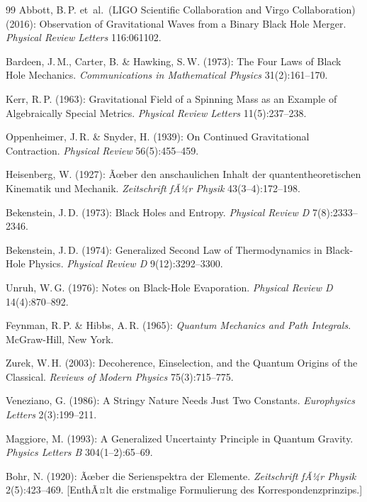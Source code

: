 ﻿\documentclass[12pt,a4paper]{report}
\begin{document}
\begin{thebibliography}{99}
Abbott, B.\,P. et\ al.\ (LIGO Scientific Collaboration and Virgo Collaboration) (2016): Observation of Gravitational Waves from a Binary Black Hole Merger. \textit{Physical Review Letters} 116:061102.

Bardeen, J.\,M., Carter, B. \& Hawking, S.\,W. (1973): The Four Laws of Black Hole Mechanics. \textit{Communications in Mathematical Physics} 31(2):161--170.

Kerr, R.\,P. (1963): Gravitational Field of a Spinning Mass as an Example of Algebraically Special Metrics. \textit{Physical Review Letters} 11(5):237--238.

Oppenheimer, J.\,R. \& Snyder, H. (1939): On Continued Gravitational Contraction. \textit{Physical Review} 56(5):455--459.


Heisenberg, W. (1927): Ãœber den anschaulichen Inhalt der quantentheoretischen Kinematik und Mechanik. \textit{Zeitschrift fÃ¼r Physik} 43(3--4):172--198.

Bekenstein, J.\,D. (1973): Black Holes and Entropy. \textit{Physical Review D} 7(8):2333--2346.

Bekenstein, J.\,D. (1974): Generalized Second Law of Thermodynamics in Black-Hole Physics. \textit{Physical Review D} 9(12):3292--3300.

Unruh, W.\,G. (1976): Notes on Black-Hole Evaporation. \textit{Physical Review D} 14(4):870--892.

Feynman, R.\,P. \& Hibbs, A.\,R. (1965): \textit{Quantum Mechanics and Path Integrals}. McGraw-Hill, New York.

Zurek, W.\,H. (2003): Decoherence, Einselection, and the Quantum Origins of the Classical. \textit{Reviews of Modern Physics} 75(3):715--775.

Veneziano, G. (1986): A Stringy Nature Needs Just Two Constants. \textit{Europhysics Letters} 2(3):199--211.

Maggiore, M. (1993): A Generalized Uncertainty Principle in Quantum Gravity. \textit{Physics Letters B} 304(1--2):65--69.

Bohr, N. (1920): Ãœber die Serienspektra der Elemente. \textit{Zeitschrift fÃ¼r Physik} 2(5):423--469. [EnthÃ¤lt die erstmalige Formulierung des Korrespondenzprinzips.]


\end{thebibliography}
\end{document}
